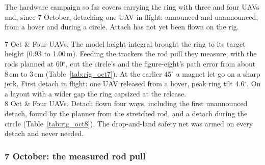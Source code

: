 
The hardware campaign so far covers carrying the ring with three and four UAVs and, since
7 October, detaching one UAV in flight: announced and unannounced, from a hover and during a circle.
Attach has not yet been flown on the rig.

7 Oct & Four UAVs. The model height integral brought the ring to its target height (0.93 to
1.00\,m). Feeding the trackers the rod pull they measure, with the rods planned at 60$^\circ$, cut the
circle's and the figure-eight's path error from about 8\,cm to 3\,cm (Table~\ref{tab:rig_oct7}). At
the earlier 45$^\circ$ a magnet let go on a sharp jerk. First detach in flight: one UAV released from
a hover, peak ring tilt 4.6$^\circ$. On a layout with a wider gap the ring capsized at the release. \\
8 Oct & Four UAVs. Detach flown four ways, including the first unannounced detach, found by the
planner from the stretched rod, and a detach during the circle (Table~\ref{tab:rig_oct8}). The
drop-and-land safety net was armed on every detach and never needed. \\

\subsubsection{7 October: the measured rod pull}

